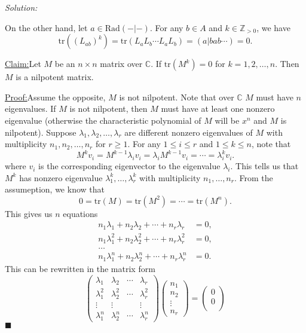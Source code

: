 \documentclass[a4paper, 12pt]{article}
\newenvironment{solution}
    {\textit{Solution:}}
    {}
\newenvironment{claim}[1]{\par\noindent\underline{Claim:}\space#1}{}
\newenvironment{claimproof}[1]{\par\noindent\underline{Proof:}\space#1}{\hfill $\blacksquare$}
\newcommand{\tr}{\text{tr}}
\newcommand{\Rad}{\text{Rad}}
\begin{document}
\begin{solution}
\begin{enumerate}[(1)]
On the other hand, let \(a\in \Rad(-|-)\). For any \(b\in A\) and \(k\in \mathbb{Z}_{>0}\), we have 
\[\tr((L_{ab})^k)=\tr(L_aL_b\cdots L_aL_b)=(a|bab\cdots)=0.\]
\begin{claim}
Let \(M\) be an \(n\times n\) matrix over \(\mathbb{C}\). If \(\tr(M^k)=0\) for \(k=1,2,\ldots,n\). Then \(M\) is a nilpotent matrix.
\end{claim}
\begin{claimproof}
Assume the opposite, \(M\) is not nilpotent. Note that over \(\mathbb{C}\) \(M\) must have \(n\) eigenvalues. If \(M\) is not nilpotent, then \(M\) must have at least one nonzero eigenvalue (otherwise the characteristic polynomial of \(M\) will be \(x^n\) and \(M\) is nilpotent). Suppose 
\(\lambda_1,\lambda_2,\ldots,\lambda_r\) are different nonzero eigenvalues of \(M\) with multiplicity \(n_1,n_2,\ldots,n_r\) for \(r\geq 1\). For any \(1\leq i\leq r\) and \(1\leq k\leq n\), note that 
\[M^kv_i=M^{k-1}\lambda_iv_i=\lambda_iM^{k-1}v_i=\cdots=\lambda_i^kv_i.\]
where \(v_i\) is the corresponding eigenvector to the eigenvalue \(\lambda_i\). This tells us that \(M^k\) has nonzero eigenvalue \(\lambda_1^k,\ldots,\lambda_r^k\) with multiplicity \(n_1,\ldots,n_r\). From the assumeption, we know that 
\[0=\tr(M)=\tr(M^2)=\cdots=\tr(M^n).\]
This gives us \(n\) equations 
\begin{align*}
    n_1\lambda_1+n_2\lambda_2+\cdots +n_r\lambda_r&=0,\\
    n_1\lambda_1^2+n_2\lambda_2^2+\cdots+n_r\lambda_r^2&=0, \\
    \ldots\\ 
    n_1\lambda_1^n+n_2\lambda_2^n+\cdots+n_r\lambda_r^n&=0.
\end{align*}
This can be rewritten in the matrix form 
\[\begin{pmatrix}
    \lambda_1&\lambda_2&\cdots&\lambda_r\\ 
    \lambda_1^2&\lambda_2^2&\cdots&\lambda_r^2\\ 
    \vdots&\vdots&&\vdots\\ 
    \lambda_1^n&\lambda_2^n&\cdots&\lambda_r^n
\end{pmatrix}\begin{pmatrix}
    n_1\\ 
    n_2\\ 
    \vdots\\ 
    n_r
\end{pmatrix}=\begin{pmatrix}
    0\\ 
    0\\ 

\end{pmatrix}\]
\end{claimproof}
\end{enumerate}
\end{solution}
\end{document}
